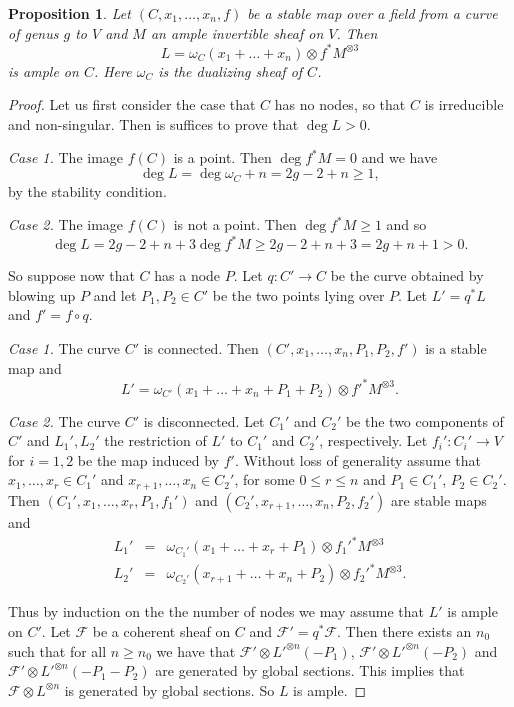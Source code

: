 \documentclass[11pt]{amsart}
\newtheorem{prop}{Proposition}[section]
\theoremstyle{definition}
\theoremstyle{remark}
\newenvironment{pf}{\begin{proof}}{\end{proof}}
\newcommand{\upst}{^{\ast}}
\newcommand{\fF}{{\mathcal{F}}}
\newcommand{\comp}{\mathbin{{\scriptstyle\circ}}}
\theoremstyle{plain}
\theoremstyle{definition}
\theoremstyle{remark}
\begin{document}
\begin{prop} \label{mplsm}
Let \((C,x_1,\ldots,x_n,f)\) be a stable map over a field from a curve of genus
\(g\) to \(V\) and \(M\) an ample invertible
sheaf on \(V\). Then
\[
L=\omega_C(x_1+\ldots+x_n)\otimes f\upst M^{\otimes3}
\]
is ample on \(C\). Here \(\omega_C\) is the dualizing sheaf of \(C\).
\end{prop}
\begin{pf}
Let us first consider the case that \(C\) has no nodes, so that \(C\) is
irreducible and non-singular. Then is suffices to
prove that \(\deg L>0\).

{\em Case 1. }The image \(f(C)\) is a point. Then \(\deg f\upst M=0\) and we have
\[
\deg L=\deg\omega_C+n=2g-2+n\geq1,
\]
by the stability condition.

{\em Case 2. }The image \(f(C)\) is not a point. Then \(\deg f\upst M\geq1\) and so
\[
\deg L=2g-2+n+3\deg f\upst M\geq 2g-2+n+3=2g+n+1>0.
\]

So suppose now that \(C\) has a node \(P\). Let \(q:C'\rightarrow C\) be the curve
obtained by blowing up \(P\) and let
\(P_1,P_2\in C'\) be the two points lying over \(P\). Let \(L'=q\upst L\) and
\(f'=f\comp q\).

{\em Case 1. }The curve \(C'\) is connected. Then
\((C',x_1,\ldots,x_n,P_1,P_2,f')\) is a stable map and
\[
L'=\omega_{C'}(x_1+\ldots+x_n+P_1+P_2)\otimes {f'}\upst M^{\otimes3}.
\]

{\em Case 2. }The curve \(C'\) is disconnected. Let \(C_1'\) and \(C_2'\) be the two
components of \(C'\) and \(L_1',L_2'\) the
restriction of \(L'\) to \(C_1'\) and \(C_2'\), respectively. Let
\(f_i':C_i'\rightarrow V\) for \(i=1,2\) be the map induced by
\(f'\). Without loss of generality assume that \(x_1,\ldots,x_r\in  C_1'\) and
\(x_{r+1},\ldots,x_n\in C_2'\), for some \(0\leq
r\leq n\) and \(P_1\in C_1'\), \(P_2\in C_2'\). Then
\((C_1',x_1,\ldots,x_r,P_1,f_1')\) and \((C_2',x_{r+1},\ldots,x_n,P_2,f_2')\)
are stable maps and
\begin{eqnarray*}
L_1' & = & \omega_{C_1'}(x_1+\ldots +x_r+P_1)\otimes {f_1'}\upst M^{\otimes3}\\
L_2' & = & \omega_{C_2'}(x_{r+1}+\ldots+x_n+P_2)\otimes {f_2'}\upst
M^{\otimes3}.
\end{eqnarray*}

Thus by induction on the the number of nodes we may assume that \(L'\) is ample
on \(C'\). Let \(\fF\) be a coherent sheaf on
\(C\) and \(\fF'=q\upst\fF\). Then there exists an \(n_0\) such that for all \(n\geq
n_0\) we have that \(\fF'\otimes{L'}^{\otimes
n}(-P_1)\), \(\fF'\otimes{L'}^{\otimes n}(-P_2)\) and \(\fF'\otimes{L'}^{\otimes
n}(-P_1-P_2)\) are generated by global
sections. This implies that \(\fF\otimes L^{\otimes n}\) is generated by global
sections. So \(L\) is ample.
\end{pf}
\end{document}
